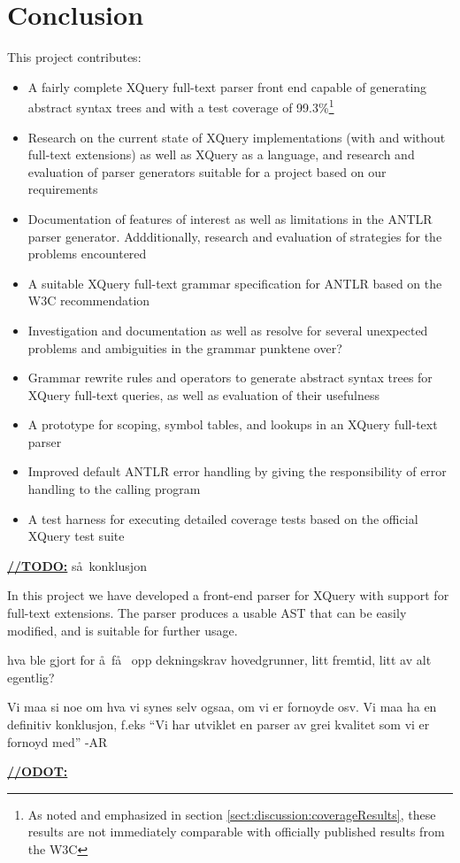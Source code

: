 \chapter{Conclusion}
\label{chapter:conclusion}
This project contributes:
\begin{itemize}
  \item A fairly complete XQuery full-text parser front end capable of
  generating abstract syntax trees and with a test coverage of
  99.3\%\footnote{As noted and emphasized in section
  \ref{sect:discussion:coverageResults},
  these results are not immediately comparable with officially published results
  from the W3C}
  \item Research on the current state of XQuery implementations (with and
  without full-text extensions) as well as XQuery as a language, and research and
  evaluation of parser generators suitable for a project based on our requirements
  \item Documentation of features of interest as well as limitations in the
  ANTLR parser generator. Addditionally, research and evaluation of
  strategies for the problems encountered
  \item A suitable XQuery full-text grammar specification for ANTLR based on the
  W3C recommendation
  \item Investigation and documentation as well as resolve for several unexpected
  problems and ambiguities in the grammar
  punktene over?
  \item Grammar rewrite rules and operators to generate abstract
  syntax trees for XQuery full-text queries, as well as evaluation of their
  usefulness
  \item A prototype for scoping, symbol tables, and lookups in an XQuery
  full-text parser
  \item Improved default ANTLR error handling by giving the responsibility
  of error handling to the calling program
  \item A test harness for executing detailed coverage tests based on the
  official XQuery test suite
\end{itemize}


\underline{\textbf{\LARGE //TODO:}}
s\aa~konklusjon

In this project we have developed a front-end parser for XQuery with support for
full-text extensions. The parser produces a usable AST that can be easily
modified, and is suitable for further usage.

hva ble gjort for \aa ~f\aa~ opp dekningskrav hovedgrunner, litt fremtid, litt
av alt egentlig? 

Vi maa si noe om hva vi synes selv ogsaa, om vi er fornoyde osv. Vi maa ha en
definitiv konklusjon, f.eks ``Vi har utviklet en parser av grei kvalitet som vi
er fornoyd med'' 
-AR

\underline{\textbf{\LARGE //ODOT:}}